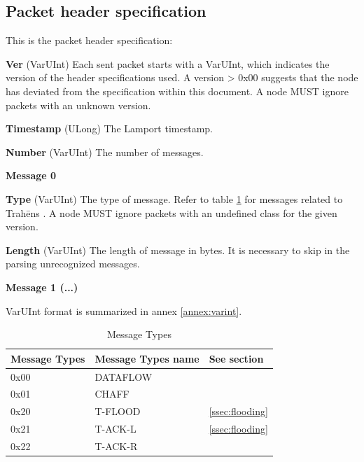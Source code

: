 \documentclass[12pt,oneside]{wlscirep}
\newcommand{\ProtoName}{Trah\={e}ns }
\begin{document}
\subsection{Packet header specification}
\label{annex:pckheadspec}

This is the packet header specification: 
\begin{description}
\item{\textbf{Ver}} (VarUInt) Each sent packet starts with a VarUInt, which indicates the version of the header specifications used. A version > 0x00 suggests that the node has deviated from the specification within this document. A node MUST ignore packets with an unknown version. 
\item{\textbf{Timestamp}} (ULong) The Lamport timestamp.
\item{\textbf{Number}} (VarUInt) The number of messages.
\item{\textbf{Message 0}}
\begin{description}
    \item{\textbf{Type}} (VarUInt) The type of message. Refer to table \ref{MessageType} for messages related to \ProtoName. A node MUST ignore packets with an undefined class for the given version.
    \item{\textbf{Length}} (VarUInt) The length of message in bytes. It is necessary to skip in the parsing unrecognized messages.
\end{description}
\item{\textbf{Message 1 (...)}}
\end{description}
VarUInt format is summarized in annex \ref{annex:varint}.
\par

\begin{table}[ht]
\centering
\begin{tabular}{lll}\\\toprule  
Message Types & Message Types name & See section \\\midrule
0x00 & DATAFLOW & \\  \midrule
0x01 & CHAFF & \\  \midrule
0x20 & T-FLOOD & \ref{ssec:flooding}\\  \midrule
0x21 & T-ACK-L & \ref{ssec:flooding}\\  \midrule
0x22 & T-ACK-R & \\  \midrule
  
\end{tabular}
\caption{Message Types}
\label{MessageType}
\end{table}
\end{document}
